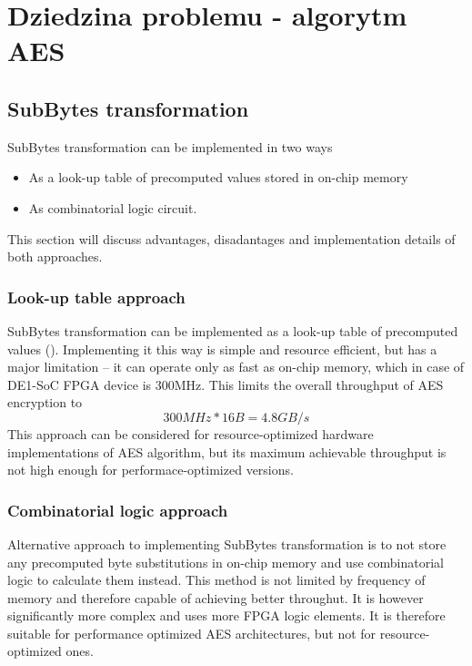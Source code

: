 \section{Dziedzina problemu - algorytm AES}
\label{sec:dziedzina-problemu}

\subsection{SubBytes transformation}

SubBytes transformation can be implemented in two ways
\begin{itemize}[nolistsep]
\item As a look-up table of precomputed values stored in on-chip memory
\item As combinatorial logic circuit.
\end{itemize}
This section will discuss advantages, disadantages and implementation details of both approaches.

\subsubsection{Look-up table approach}
SubBytes transformation can be implemented as a look-up table of precomputed values (\cite[Fig. 7]{aes-standard}). Implementing it this way is simple and resource efficient, but has a major limitation -- it can operate only as fast as on-chip memory, which in case of DE1-SoC FPGA device is 300MHz. This limits the overall throughput of AES encryption to
$$
300MHz * 16B = 4.8GB/s
$$
This approach can be considered for resource-optimized hardware implementations of AES algorithm, but its maximum achievable throughput is not high enough for performace-optimized versions.


\subsubsection{Combinatorial logic approach}
Alternative approach to implementing SubBytes transformation is to not store any precomputed byte substitutions in on-chip memory and use combinatorial logic to calculate them instead. This method is not limited by frequency of memory and therefore capable of achieving better throughut. It is however significantly more complex and uses more FPGA logic elements. It is therefore suitable for performance optimized AES architectures, but not for resource-optimized ones.

